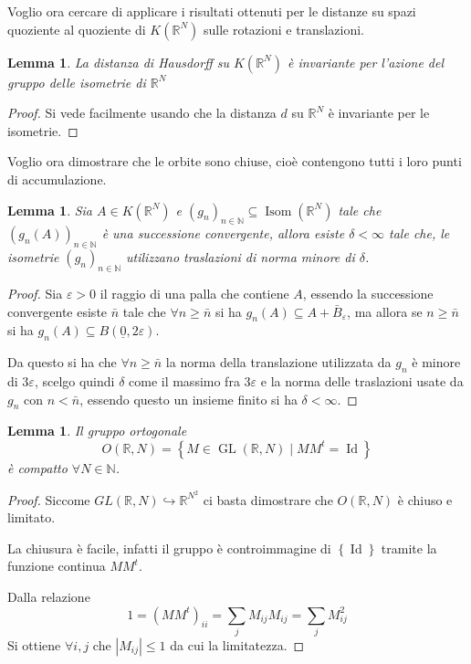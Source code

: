 \documentclass[a4paper,10pt]{article}
\newcounter{counter1}
\theoremstyle{plain}
\newtheorem{mylem}[counter1]{Lemma}
\theoremstyle{definition}
\theoremstyle{remark}
\newcommand{\ubar}[1]{\underline{#1}}
\newcommand{\set}[1]{\left\{#1\right\}}
\newcommand{\pa}[1]{\left(#1\right)}
\newcommand{\abs}[1]{\left|#1\right|}
\DeclareMathOperator{\id}{Id}
\DeclareMathOperator{\gl}{GL}
\DeclareMathOperator{\isom}{Isom}
\begin{document}
Voglio ora cercare di applicare i risultati ottenuti per le distanze
su spazi quoziente al quoziente di $K(\mathbb{R}^N)$ sulle rotazioni e
translazioni.

\begin{mylem}
  La distanza di Hausdorff su $K(\mathbb{R}^N)$ è invariante per
  l'azione del gruppo delle isometrie di $\mathbb{R}^N$
\end{mylem}
\begin{proof}
  Si vede facilmente usando che la distanza $d$ su $\mathbb{R}^N$ è
  invariante per le isometrie.
\end{proof}

Voglio ora dimostrare che le orbite sono chiuse, cioè contengono tutti
i loro punti di accumulazione.

\begin{mylem}
  \label{lem:traslazionipiccole}
  Sia $A \in K(\mathbb{R}^N)$ e $\pa{ g_n} _{n \in \mathbb{N}}
  \subseteq \isom( \mathbb{R}^N)$ tale che $\pa{ g_n(A) } _{n \in
    \mathbb{N}}$ è una successione convergente, allora esiste $\delta
  < \infty$ tale che, le isometrie $\pa{ g_n} _{n\in \mathbb{N}}$
  utilizzano traslazioni di norma minore di $\delta$.
\end{mylem}
\begin{proof}
  Sia $\varepsilon > 0$ il raggio di una palla che contiene $A$,
  essendo la successione convergente esiste $\bar n$ tale che $\forall
  n \ge \bar n$ si ha $g_n(A) \subseteq A + \bar B _{\varepsilon}$, ma
  allora se $n \ge \bar n$ si ha $g_n(A) \subseteq B(\ubar{0},
  2\varepsilon)$.

  Da questo si ha che $\forall n \ge \bar n$ la norma della
  translazione utilizzata da $g_n$ è minore di $3 \varepsilon$, scelgo
  quindi $\delta$ come il massimo fra $3\varepsilon$ e la norma delle
  traslazioni usate da $g_n$ con $n< \bar n$, essendo questo un
  insieme finito si ha $\delta < \infty$.
\end{proof}

\begin{mylem}
  Il gruppo ortogonale 
  \[ O(\mathbb{R},N) = \set{ M \in \gl (\mathbb{R},N) \mid M M^t =
    \id } \]
  è compatto $\forall N \in \mathbb{N}$.
\end{mylem}
\begin{proof}
  Siccome $GL(\mathbb{R},N) \hookrightarrow \mathbb{R}^{N^2}$ ci basta
  dimostrare che $O(\mathbb{R},N)$ è chiuso e limitato.
  
  La chiusura è facile, infatti il gruppo è controimmagine di
  $\set{\id}$ tramite la funzione continua $MM^t$.

  Dalla relazione
  \[ 1 = \pa{MM^t}_{ii} = \sum _j M_{ij} M_{ij} = \sum _j M_{ij} ^2 \] 
  Si ottiene $\forall i,j$ che $\abs{M_{ij}} \le 1$ da cui la
  limitatezza.
\end{proof}
\end{document}
